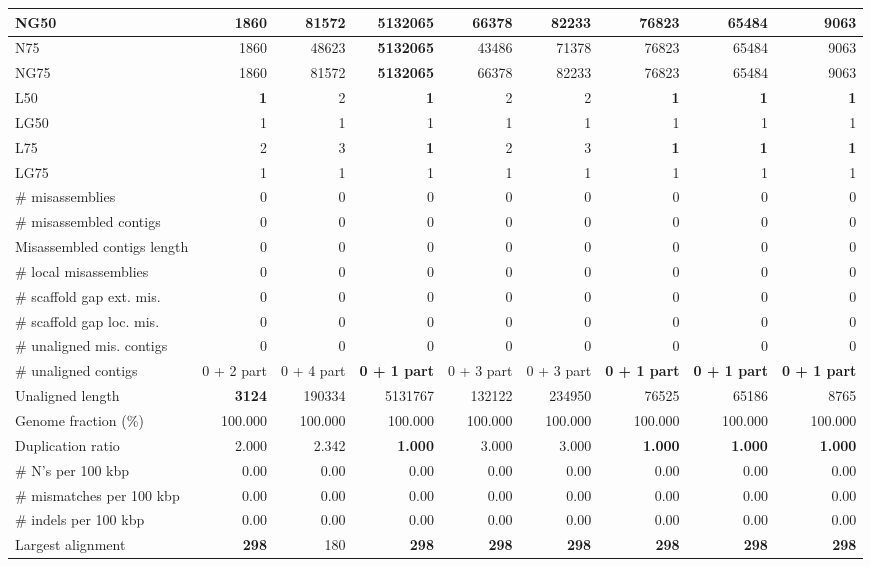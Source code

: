 \documentclass[12pt,a4paper]{article}
\begin{document}
\begin{table}[ht]
\begin{center}
\begin{tabular}{|l*{8}{|r}|}
NG50 & 1860 & 81572 & {\bf 5132065} & 66378 & 82233 & 76823 & 65484 & 9063 \\ \hline
N75 & 1860 & 48623 & {\bf 5132065} & 43486 & 71378 & 76823 & 65484 & 9063 \\ \hline
NG75 & 1860 & 81572 & {\bf 5132065} & 66378 & 82233 & 76823 & 65484 & 9063 \\ \hline
L50 & {\bf 1} & 2 & {\bf 1} & 2 & 2 & {\bf 1} & {\bf 1} & {\bf 1} \\ \hline
LG50 & 1 & 1 & 1 & 1 & 1 & 1 & 1 & 1 \\ \hline
L75 & 2 & 3 & {\bf 1} & 2 & 3 & {\bf 1} & {\bf 1} & {\bf 1} \\ \hline
LG75 & 1 & 1 & 1 & 1 & 1 & 1 & 1 & 1 \\ \hline
\# misassemblies & 0 & 0 & 0 & 0 & 0 & 0 & 0 & 0 \\ \hline
\# misassembled contigs & 0 & 0 & 0 & 0 & 0 & 0 & 0 & 0 \\ \hline
Misassembled contigs length & 0 & 0 & 0 & 0 & 0 & 0 & 0 & 0 \\ \hline
\# local misassemblies & 0 & 0 & 0 & 0 & 0 & 0 & 0 & 0 \\ \hline
\# scaffold gap ext. mis. & 0 & 0 & 0 & 0 & 0 & 0 & 0 & 0 \\ \hline
\# scaffold gap loc. mis. & 0 & 0 & 0 & 0 & 0 & 0 & 0 & 0 \\ \hline
\# unaligned mis. contigs & 0 & 0 & 0 & 0 & 0 & 0 & 0 & 0 \\ \hline
\# unaligned contigs & 0 + 2 part & 0 + 4 part & {\bf 0 + 1 part} & 0 + 3 part & 0 + 3 part & {\bf 0 + 1 part} & {\bf 0 + 1 part} & {\bf 0 + 1 part} \\ \hline
Unaligned length & {\bf 3124} & 190334 & 5131767 & 132122 & 234950 & 76525 & 65186 & 8765 \\ \hline
Genome fraction (\%) & 100.000 & 100.000 & 100.000 & 100.000 & 100.000 & 100.000 & 100.000 & 100.000 \\ \hline
Duplication ratio & 2.000 & 2.342 & {\bf 1.000} & 3.000 & 3.000 & {\bf 1.000} & {\bf 1.000} & {\bf 1.000} \\ \hline
\# N's per 100 kbp & 0.00 & 0.00 & 0.00 & 0.00 & 0.00 & 0.00 & 0.00 & 0.00 \\ \hline
\# mismatches per 100 kbp & 0.00 & 0.00 & 0.00 & 0.00 & 0.00 & 0.00 & 0.00 & 0.00 \\ \hline
\# indels per 100 kbp & 0.00 & 0.00 & 0.00 & 0.00 & 0.00 & 0.00 & 0.00 & 0.00 \\ \hline
Largest alignment & {\bf 298} & 180 & {\bf 298} & {\bf 298} & {\bf 298} & {\bf 298} & {\bf 298} & {\bf 298} \\ \hline

\end{tabular}
\end{center}
\end{table}
\end{document}
